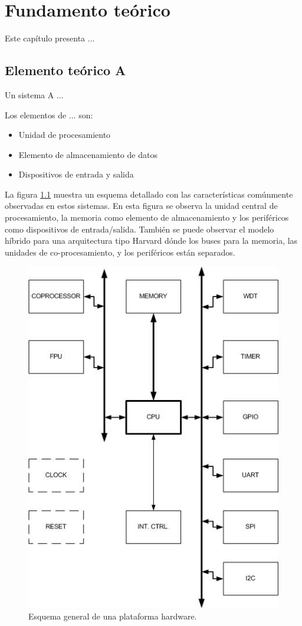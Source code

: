 \chapter{Fundamento teórico}
Este capítulo presenta ...

\section{Elemento teórico A}
Un sistema A ...

Los elementos de ... son:
\begin{itemize}
\item{Unidad de procesamiento}
\item{Elemento de almacenamiento de datos}
\item{Dispositivos de entrada y salida}
\end{itemize}

La figura \ref{esquema_gral_plat_hw} muestra un esquema detallado con las características comúnmente observadas en estos sistemas. En esta figura se observa la unidad central de procesamiento, la memoria como elemento de almacenamiento y los periféricos como dispositivos de entrada/salida. También se puede observar el modelo híbrido para una arquitectura tipo Harvard dónde los buses para la memoria, las unidades de co-procesamiento, y los periféricos están separados.

\begin{figure}[p]
  \centering
  \includegraphics[width=12cm]{fig/ARQ_SE_DETALLE_1.jpg} 
  \caption[Esquema general de una plataforma hardware.]%
  {Esquema general de una plataforma hardware.}
  \label{esquema_gral_plat_hw}
\end{figure}


